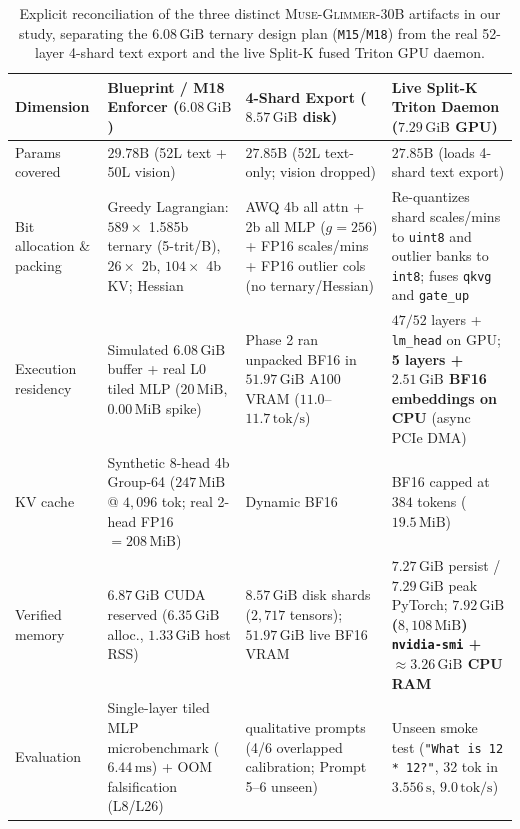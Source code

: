 \documentclass[10pt]{article} %
\newcommand{\glimmer}{\textsc{Muse-Glimmer-30B}}
\begin{document}
\begin{table}[t]
\caption{Explicit reconciliation of the three distinct \glimmer{} artifacts in our study, separating the $6.08\,\text{GiB}$ ternary design plan (\texttt{M15}/\texttt{M18}) from the real 52-layer 4-shard text export and the live Split-K fused Triton GPU daemon.}
\label{tab:30b_reconcile}
\begin{center}
\scriptsize\setlength{\tabcolsep}{3pt}
\begin{tabularx}{\linewidth}{>{\raggedright\arraybackslash}p{1.9cm} >{\raggedright\arraybackslash}X >{\raggedright\arraybackslash}X >{\raggedright\arraybackslash}X}
\toprule
\textbf{Dimension} & \textbf{Blueprint / M18 Enforcer ($6.08\,\text{GiB}$)} & \textbf{4-Shard Export ($8.57\,\text{GiB}$ disk)} & \textbf{Live Split-K Triton Daemon ($7.29\,\text{GiB}$ GPU)} \\
\midrule
Params covered & $29.78\text{B}$ (52L text + 50L vision) & $27.85\text{B}$ (52L text-only; vision dropped) & $27.85\text{B}$ (loads 4-shard text export) \\
Bit allocation \& packing & Greedy Lagrangian: $589\times$ 1.585b ternary (5-trit/B), $26\times$ 2b, $104\times$ 4b KV; Hessian & AWQ 4b all attn + 2b all MLP ($g=256$) + FP16 scales/mins + FP16 outlier cols (no ternary/Hessian) & Re-quantizes shard scales/mins to \texttt{uint8} and outlier banks to \texttt{int8}; fuses \texttt{qkvg} and \texttt{gate\_up} \\
Execution residency & Simulated $6.08\,\text{GiB}$ buffer + real L0 tiled MLP ($20\,\text{MiB}$, $0.00\,\text{MiB}$ spike) & Phase 2 ran unpacked BF16 in $51.97\,\text{GiB}$ A100 VRAM ($11.0$--$11.7\,\text{tok/s}$) & $47/52$ layers + \texttt{lm\_head} on GPU; \textbf{5 layers + $2.51\,\text{GiB}$ BF16 embeddings on CPU} (async PCIe DMA) \\
KV cache & Synthetic 8-head 4b Group-64 ($247\,\text{MiB}$ @ $4{,}096$ tok; real 2-head FP16 $= 208\,\text{MiB}$) & Dynamic BF16 & BF16 capped at $384$ tokens ($19.5\,\text{MiB}$) \\
Verified memory & $6.87\,\text{GiB}$ CUDA reserved ($6.35\,\text{GiB}$ alloc., $1.33\,\text{GiB}$ host RSS) & $8.57\,\text{GiB}$ disk shards ($2{,}717$ tensors); $51.97\,\text{GiB}$ live BF16 VRAM & $7.27\,\text{GiB}$ persist / $7.29\,\text{GiB}$ peak PyTorch; \textbf{$7.92\,\text{GiB}$ ($8{,}108\,\text{MiB}$) \texttt{nvidia-smi} + $\approx 3.26\,\text{GiB}$ CPU RAM} \\
Evaluation & Single-layer tiled MLP microbenchmark ($6.44\,\text{ms}$) + OOM falsification (L8/L26) & 6 qualitative prompts (4/6 overlapped calibration; Prompt 5--6 unseen) & Unseen smoke test (\texttt{"What is 12 * 12?"}, 32 tok in $3.556\,\text{s}$, $9.0\,\text{tok/s}$) \\
\bottomrule
\end{tabularx}
\end{center}
\end{table}
\end{document}
